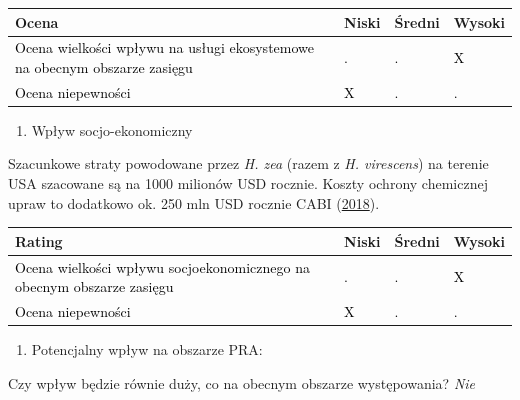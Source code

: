 \documentclass[polish,a4paper]{article}
\providecommand{\tightlist}{%
  \setlength{\itemsep}{0pt}\setlength{\parskip}{0pt}}
\begin{document}
\begin{tabu} to 
\toprule
{}  \textbf{Ocena} & \textbf{Niski} & \textbf{Średni} & \textbf{Wysoki}\\
\midrule
{}  \textcolor{black}{Ocena wielkości wpływu na usługi ekosystemowe na obecnym obszarze zasięgu} & \textcolor{black}{.} & \textcolor{black}{.} & \textcolor{black}{X}\\
  \textcolor{black}{Ocena niepewności} & \textcolor{black}{X} & \textcolor{black}{.} & \textcolor{black}{.}\\
\bottomrule
\end{tabu}

\begin{enumerate}
\def\labelenumi{\Roman{enumi})}
\setcounter{enumi}{2}
\tightlist
\item
  Wpływ socjo-ekonomiczny
\end{enumerate}

Szacunkowe straty powodowane przez \emph{H. zea} (razem z \emph{H.
virescens}) na terenie USA szacowane są na 1000 milionów USD rocznie.
Koszty ochrony chemicznej upraw to dodatkowo ok. 250 mln USD rocznie
CABI (\protect\hyperlink{ref-cabi2017}{2018}).

\begin{tabu} to 
\toprule
{}  \textbf{Rating} & \textbf{Niski} & \textbf{Średni} & \textbf{Wysoki}\\
\midrule
{}  \textcolor{black}{Ocena wielkości wpływu socjoekonomicznego na obecnym obszarze zasięgu} & \textcolor{black}{.} & \textcolor{black}{.} & \textcolor{black}{X}\\
  \textcolor{black}{Ocena niepewności} & \textcolor{black}{X} & \textcolor{black}{.} & \textcolor{black}{.}\\
\bottomrule
\end{tabu}

\begin{enumerate}
\def\labelenumi{(\arabic{enumi})}
\setcounter{enumi}{12}
\tightlist
\item
  Potencjalny wpływ na obszarze PRA:
\end{enumerate}

Czy wpływ będzie równie duży, co na obecnym obszarze występowania?
\emph{Nie}
\end{document}

